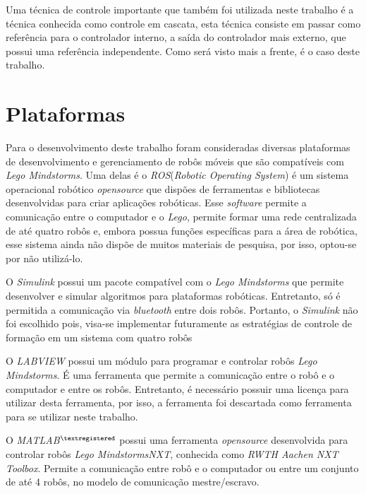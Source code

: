 Uma técnica de controle importante que também foi utilizada neste trabalho é a técnica conhecida como controle em cascata, esta técnica consiste em passar como referência para o controlador interno, a saída do controlador mais externo, que possui uma referência independente.%
 Como será visto mais a frente, é o caso deste trabalho.

\section{Plataformas}
\label{sec:plataformas}
Para o desenvolvimento deste trabalho foram consideradas diversas plataformas de desenvolvimento e gerenciamento de robôs móveis que são compatíveis com \emph{Lego Mindstorms\textregistered}. %
Uma delas é o \emph{ROS}(\emph{Robotic Operating System}) é um sistema operacional robótico \emph{opensource} que dispões de ferramentas e bibliotecas desenvolvidas para criar aplicações robóticas. %
Esse \emph{software} permite a comunicação entre o computador e o \emph{Lego}, permite formar uma rede centralizada de até quatro robôs e, embora possua funções específicas para a área de robótica, esse sistema ainda não dispõe de muitos materiais de pesquisa, por isso, optou-se por não utilizá-lo.

O \emph{Simulink} possui um pacote compatível com o \emph{Lego Mindstorms\textregistered} que permite desenvolver e simular algoritmos para plataformas robóticas. Entretanto, só é permitida a comunicação via \emph{bluetooth} entre dois robôs. Portanto, o \emph{Simulink} não foi escolhido pois, visa-se implementar futuramente as estratégias de controle de formação em um sistema com quatro robôs

O \emph{LABVIEW} possui um módulo para programar e controlar robôs \emph{Lego Mindstorms\textregistered}. É uma ferramenta que permite a comunicação entre o robô e o computador e entre os robôs. Entretanto, é necessário possuir uma licença para utilizar desta ferramenta, por isso, a ferramenta foi descartada como ferramenta para se utilizar neste trabalho.

O \emph{MATLAB$^{\textregistered}$} possui uma ferramenta \emph{opensource} desenvolvida para controlar robôs \emph{Lego Mindstorms\textregistered NXT}, conhecida como \emph{RWTH Aachen NXT Toolbox}. Permite a comunicação entre robô e o computador ou entre um conjunto de até 4 robôs, no modelo de comunicação mestre/escravo. 

